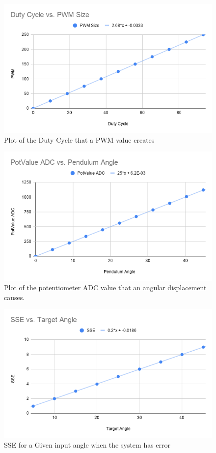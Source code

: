 \documentclass[a4paper, 11pt, compsoc]{IEEEtran}
\begin{document}
			\begin{figure}[!ht]
				\centering
				\includegraphics[width=0.8\columnwidth]{dutyCyclePWM.png}
				\caption{Plot of the Duty Cycle that a PWM value creates}
				\label{fig:DCPWM}
			\end{figure}

			\begin{figure}[!ht]
				\centering
				\includegraphics[width=0.8\columnwidth]{potPen.png}
				\caption{Plot of the potentiometer ADC value that an angular displacement causes.}
				\label{fig:potPen}
			\end{figure}
			
			\begin{figure}[!ht]
				\centering
				\includegraphics[width=0.8\columnwidth]{lab4SSEvsTarget Angle.png}
				\caption{SSE for a Given input angle when the system has error}
				\label{fig:lab4SSE}
			\end{figure}
\end{document}
